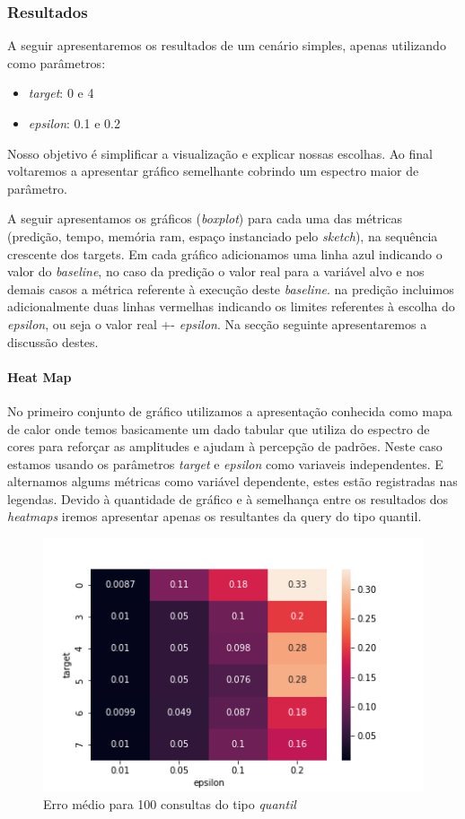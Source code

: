 \documentclass[11pt]{article}
\begin{document}
\subsubsection{Resultados}

A seguir apresentaremos os resultados de um cenário simples, apenas utilizando como parâmetros:
\begin{itemize}
  \item \emph{target}: 0 e 4
  \item \emph{epsilon}: 0.1 e 0.2
\end{itemize}

Nosso objetivo é simplificar a visualização e explicar nossas escolhas. Ao final voltaremos a apresentar gráfico semelhante cobrindo um espectro maior de parâmetro.


A seguir apresentamos os gráficos (\emph{boxplot}) para cada uma das métricas (predição, tempo, memória ram, espaço instanciado pelo \emph{sketch}), na sequência crescente dos targets. Em cada gráfico adicionamos uma linha azul indicando o valor do \emph{baseline}, no caso da predição o valor real para a variável alvo e nos demais casos a métrica referente à execução deste \emph{baseline}. na predição incluimos adicionalmente duas linhas vermelhas indicando os limites referentes à escolha do \emph{epsilon}, ou seja o valor real +- \emph{epsilon}. Na secção seguinte apresentaremos a discussão destes.
\newpage

\paragraph{Heat Map}

No primeiro conjunto de gráfico utilizamos a apresentação conhecida como mapa de calor onde temos basicamente um dado tabular que utiliza do espectro de cores para reforçar as amplitudes e ajudam à percepção de padrões. Neste caso estamos usando os parâmetros \emph{target} e \emph{epsilon} como variaveis independentes. E alternamos algums métricas como variável dependente, estes estão registradas nas legendas. Devido à quantidade de gráfico e à semelhança entre os resultados dos \emph{heatmaps} iremos apresentar apenas os resultantes da query do tipo quantil.


\begin{figure}[H]
  \centering
  \includegraphics[scale=0.5]{../../img/QUANTIL_heatmap_ERRO.png}
  \caption{Erro médio para 100 consultas do tipo \emph{quantil}}
\end{figure}
\end{document}
